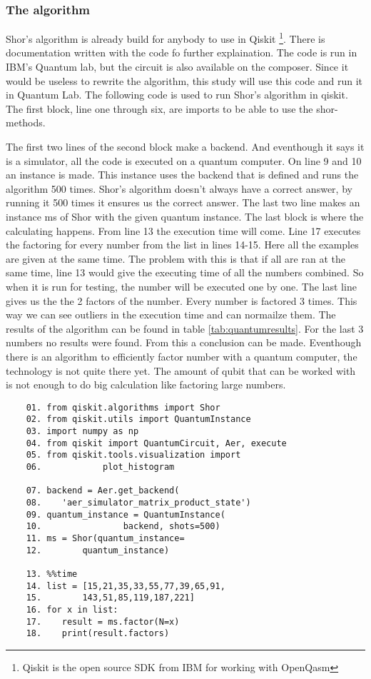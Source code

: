 \subsubsection{The algorithm}
Shor's algorithm is already build for anybody to use in Qiskit \footnote{Qiskit is the open source SDK from IBM for working with OpenQasm}. There is documentation written with the code fo further explaination.
The code is run in IBM's Quantum lab, but the circuit is also available on the composer. Since it would be useless to rewrite the algorithm, this study will use this code and run it in Quantum Lab.
The following code is used to run Shor's algorithm in qiskit. The first block, line one through six, are imports to be able to use the shor-methods.

The first two lines of the second block make a backend. And eventhough it says it is a simulator, all the code is executed on a quantum computer.
On line 9 and 10 an instance is made. This instance uses the backend that is defined and runs the algorithm 500 times. Shor's algorithm doesn't always have a correct answer, by running it 500 times it ensures us the correct answer.
The last two line makes an instance ms of Shor with the given quantum instance.
The last block is where the calculating happens.
From line 13 the execution time will come.
Line 17 executes the factoring for every number from the list in lines 14-15. Here all the examples are given at the same time. The problem with this is that if all are ran at the same time, line 13 would give the executing time of all the numbers combined.
So when it is run for testing, the number will be executed one by one.
The last line gives us the the 2 factors of the number.
Every number is factored 3 times. This way we can see outliers in the execution time and can normailze them.
The results of the algorithm can be found in table \ref{tab:quantumresults}. For the last 3 numbers no results were found. 
From this a conclusion can be made. Eventhough there is an algorithm to efficiently factor number with a quantum computer, the technology is not quite there yet.
The amount of qubit that can be worked with is not enough to do big calculation like factoring large numbers.

\begin{lstlisting}
    01. from qiskit.algorithms import Shor
    02. from qiskit.utils import QuantumInstance
    03. import numpy as np
    04. from qiskit import QuantumCircuit, Aer, execute
    05. from qiskit.tools.visualization import
    06.            plot_histogram

    07. backend = Aer.get_backend(
    08.    'aer_simulator_matrix_product_state')
    09. quantum_instance = QuantumInstance(
    10.                backend, shots=500)
    11. ms = Shor(quantum_instance=
    12.        quantum_instance)

    13. %%time
    14. list = [15,21,35,33,55,77,39,65,91,
    15.        143,51,85,119,187,221]
    16. for x in list:
    17.    result = ms.factor(N=x)
    18.    print(result.factors)
\end{lstlisting}

